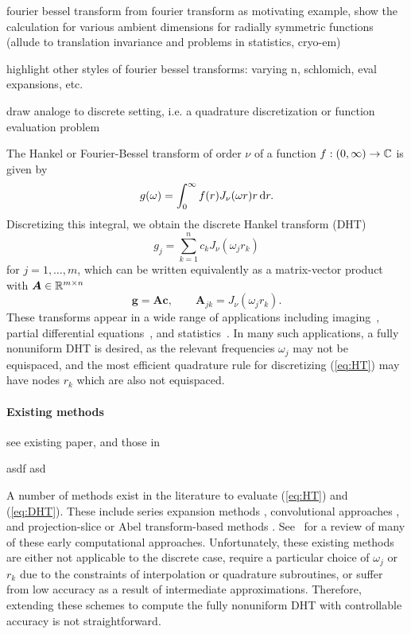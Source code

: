 fourier bessel transform from fourier transform as motivating example, show the
calculation for various ambient dimensions for radially symmetric functions
(allude to translation invariance and problems in statistics, cryo-em)

highlight other styles of fourier bessel transforms: varying n, schlomich, eval
expansions, etc.

draw analoge to discrete setting, i.e. a quadrature discretization or function
evaluation problem







The Hankel or Fourier-Bessel transform of order $\nu$ of a function $f : (0,
\infty) \to \mathbb{C}$ is given by
\begin{equation} \label{eq:HT}
    g(\omega) = \int_0^\infty f(r) J_\nu(\omega r) r \dif{r}.
\end{equation}
Discretizing this integral, we obtain the discrete Hankel transform (DHT)
\begin{equation} \label{eq:DHT}
    g_j = \sum_{k=1}^n c_k J_\nu(\omega_j r_k)
\end{equation}
for $j=1, \dots, m$, which can be written equivalently as a matrix-vector
product with $\bm{A} \in \mathbb{R}^{m \times n}$
\begin{equation}
    \bm{g} = \bm{A}\bm{c}, \qquad \bm{A}_{jk} = J_\nu(\omega_j r_k).
\end{equation}
These transforms appear in a wide range of applications including
imaging~\cite{higgins1988hankel, zhao2013fourier}, partial differential
equations~\cite{bisseling1985fast,ali1999generalized}, and
statistics~\cite{lord1954a, genton2002nonparametric}. In many such
applications, a fully nonuniform DHT is desired, as the relevant frequencies
$\omega_j$ may not be equispaced, and the most efficient quadrature rule for
discretizing (\ref{eq:HT}) may have nodes $r_k$ which are also not equispaced.

\paragraph{Existing methods}

see existing paper, and those in

asdf
asd



A number of methods exist in the literature to evaluate (\ref{eq:HT}) and
(\ref{eq:DHT}). These include series expansion methods
\cite{lord1954b,brunol1977fourier,cavanagh1979numerical},
convolutional approaches \cite{siegman1977quasi, johansen1979fast,
mook1983algorithm, liu1999nonuniform}, and projection-slice or Abel transform-based methods
\cite{oppenheim1980computation, hansen1985fast, kapur1995algorithm}.
See~\cite{cree1993algorithms} for a review of many of these early computational
approaches. Unfortunately, these existing methods are either not applicable to
the discrete case, require a particular choice of $\omega_j$ or $r_k$ due to the
constraints of interpolation or quadrature subroutines, or suffer from low
accuracy as a result of intermediate approximations. Therefore, extending these
schemes to compute the fully nonuniform DHT with controllable accuracy is not
straightforward.

